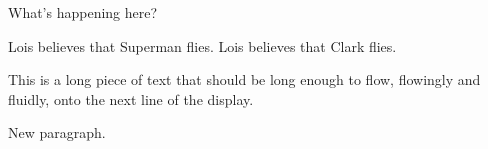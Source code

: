 \documentclass[leqno, 10pt]{article}
\begin{document}
What's happening here?
\begin{prop}
    \pitem
    \begin{prop}
        \pitem 
        Lois believes that Superman flies.
        \pitem
        Lois believes that Clark flies.  
    \end{prop}
    \pitem
    This is a long piece of text that should be long enough to flow, flowingly and fluidly, onto the next line of the display.

    New paragraph.
\end{prop}
\end{document}
